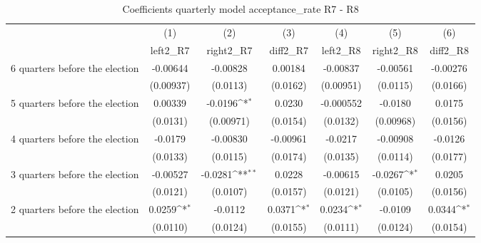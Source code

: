 \begin{table}[htbp]\centering
\def\sym#1{\ifmmode^{#1}\else\(^{#1}\)\fi}
\caption{Coefficients quarterly model acceptance\_rate R7 - R8}
\begin{tabular}{l*{6}{c}}
\hline\hline
                    &\multicolumn{1}{c}{(1)}&\multicolumn{1}{c}{(2)}&\multicolumn{1}{c}{(3)}&\multicolumn{1}{c}{(4)}&\multicolumn{1}{c}{(5)}&\multicolumn{1}{c}{(6)}\\
                    &\multicolumn{1}{c}{left2\_R7}&\multicolumn{1}{c}{right2\_R7}&\multicolumn{1}{c}{diff2\_R7}&\multicolumn{1}{c}{left2\_R8}&\multicolumn{1}{c}{right2\_R8}&\multicolumn{1}{c}{diff2\_R8}\\
\hline
 6 quarters before the election&    -0.00644         &    -0.00828         &     0.00184         &    -0.00837         &    -0.00561         &    -0.00276         \\
                    &   (0.00937)         &    (0.0113)         &    (0.0162)         &   (0.00951)         &    (0.0115)         &    (0.0166)         \\
[1em]
 5 quarters before the election&     0.00339         &     -0.0196\sym{*}  &      0.0230         &   -0.000552         &     -0.0180         &      0.0175         \\
                    &    (0.0131)         &   (0.00971)         &    (0.0154)         &    (0.0132)         &   (0.00968)         &    (0.0156)         \\
[1em]
 4 quarters before the election&     -0.0179         &    -0.00830         &    -0.00961         &     -0.0217         &    -0.00908         &     -0.0126         \\
                    &    (0.0133)         &    (0.0115)         &    (0.0174)         &    (0.0135)         &    (0.0114)         &    (0.0177)         \\
[1em]
 3 quarters before the election&    -0.00527         &     -0.0281\sym{**} &      0.0228         &    -0.00615         &     -0.0267\sym{*}  &      0.0205         \\
                    &    (0.0121)         &    (0.0107)         &    (0.0157)         &    (0.0121)         &    (0.0105)         &    (0.0156)         \\
[1em]
 2 quarters before the election&      0.0259\sym{*}  &     -0.0112         &      0.0371\sym{*}  &      0.0234\sym{*}  &     -0.0109         &      0.0344\sym{*}  \\
                    &    (0.0110)         &    (0.0124)         &    (0.0155)         &    (0.0111)         &    (0.0124)         &    (0.0154)         \\

\end{tabular}
\end{table}

